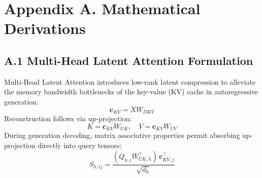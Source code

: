 \section{Appendix A. Mathematical Derivations}
\subsection{A.1 Multi-Head Latent Attention Formulation}
Multi-Head Latent Attention introduces low-rank latent compression to alleviate the memory bandwidth bottlenecks of the key-value (KV) cache in autoregressive generation.
\begin{equation}
\mathbf{c}_{KV} = X W_{DKV}
\end{equation}
Reconstruction follows via up-projection:
\begin{equation}
K = \mathbf{c}_{KV} W_{UK}, \quad V = \mathbf{c}_{KV} W_{UV}
\end{equation}
During generation decoding, matrix associative properties permit absorbing up-projection directly into query tensors:
\begin{equation}
S_{h, ij} = \frac{(Q_{h, i} W_{UK, h}^\top) \, \mathbf{c}_{KV, j}^\top}{\sqrt{d_h}}
\end{equation}
